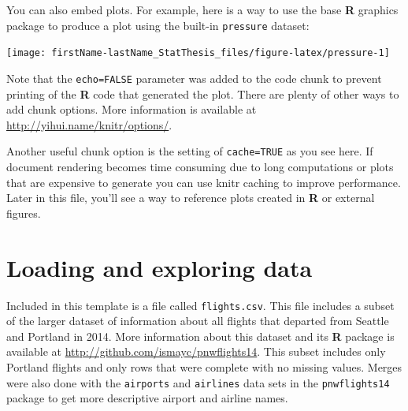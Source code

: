 \documentclass[12pt, twoside]{amherstthesis}
\theoremstyle{definition}
\theoremstyle{definition}
\theoremstyle{definition}
\theoremstyle{remark}
\begin{document}
You can also embed plots. For example, here is a way to use the base \textbf{R} graphics package to produce a plot using the built-in \texttt{pressure} dataset:
\begin{center}\texttt{[image: firstName-lastName\_StatThesis\_files/figure-latex/pressure-1]} \end{center}

Note that the \texttt{echo=FALSE} parameter was added to the code chunk to prevent printing of the \textbf{R} code that generated the plot. There are plenty of other ways to add chunk options. More information is available at \url{http://yihui.name/knitr/options/}.

Another useful chunk option is the setting of \texttt{cache=TRUE} as you see here. If document rendering becomes time consuming due to long computations or plots that are expensive to generate you can use knitr caching to improve performance. Later in this file, you'll see a way to reference plots created in \textbf{R} or external figures.

\hypertarget{loading-and-exploring-data}{%
\section{Loading and exploring data}\label{loading-and-exploring-data}}

Included in this template is a file called \texttt{flights.csv}. This file includes a subset of the larger dataset of information about all flights that departed from Seattle and Portland in 2014. More information about this dataset and its \textbf{R} package is available at \url{http://github.com/ismayc/pnwflights14}. This subset includes only Portland flights and only rows that were complete with no missing values. Merges were also done with the \texttt{airports} and \texttt{airlines} data sets in the \texttt{pnwflights14} package to get more descriptive airport and airline names.
\end{document}
